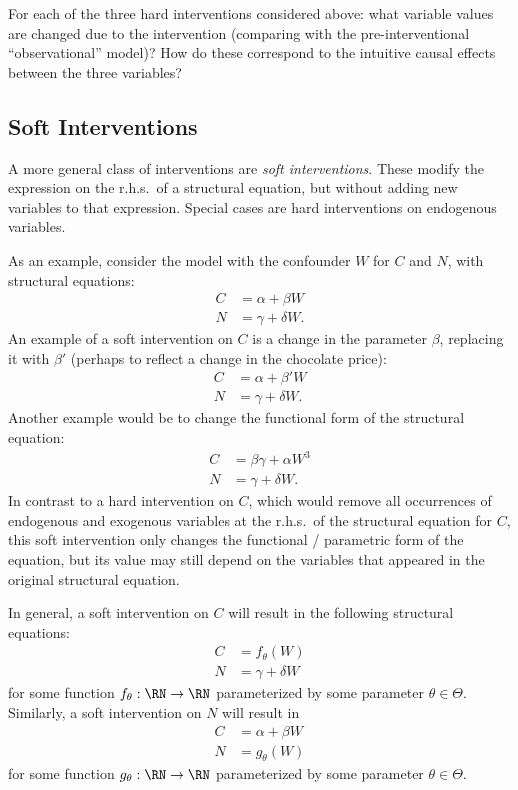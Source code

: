 \begin{Exc}
  For each of the three hard interventions considered above: what variable values are changed due to the intervention (comparing with the pre-interventional ``observational'' model)? 
  How do these correspond to the intuitive causal effects between the three variables?
\end{Exc}

\subsection{Soft Interventions}

A more general class of interventions are \emph{soft interventions}. These modify 
the expression on the r.h.s.\ of a structural equation, but without adding new variables
to that expression. Special cases are hard interventions on endogenous variables.

As an example, consider the model with the confounder $W$ for $C$ and $N$, with 
structural equations:
    \begin{align*}
      C &= \alpha + \beta W \\
      N &= \gamma + \delta W.
    \end{align*}
An example of a soft intervention on $C$ is a change in the parameter $\beta$, replacing it
with $\beta'$ (perhaps to reflect a change in the chocolate price):
    \begin{align*}
      C &= \alpha + \beta' W \\
      N &= \gamma + \delta W.
    \end{align*}
Another example would be to change the functional form of the structural equation:
    \begin{align*}
      C &= \beta\gamma + \alpha W^3 \\
      N &= \gamma + \delta W.
    \end{align*}
In contrast to a hard intervention on $C$, which would remove all occurrences of 
endogenous and exogenous variables at the r.h.s.\ of the structural equation for $C$,
this soft intervention only changes the functional / parametric form of the equation,
but its value may still depend on the variables that appeared in the original 
structural equation.

In general, a soft intervention on $C$ will result in the following structural equations:
    \begin{align*}
      C &= f_{\theta}(W) \\
      N &= \gamma + \delta W
    \end{align*}
for some function $f_{\theta} : \RN \to \RN$ parameterized by some parameter $\theta \in \Theta$.
Similarly, a soft intervention on $N$ will result in
    \begin{align*}
      C &= \alpha + \beta W \\
      N &= g_{\theta}(W)
    \end{align*}
for some function $g_{\theta} : \RN \to \RN$ parameterized by some parameter $\theta \in \Theta$.

